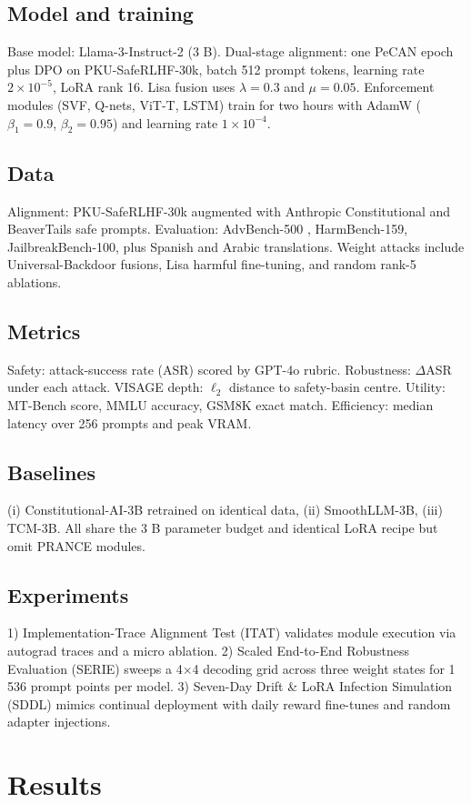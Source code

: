 \documentclass{article}
\begin{document}
\subsection{Model and training}
Base model: Llama-3-Instruct-2 (3 B). Dual-stage alignment: one PeCAN epoch plus DPO on PKU-SafeRLHF-30k, batch 512 prompt tokens, learning rate $2\times 10^{-5}$, LoRA rank 16. Lisa fusion uses $\lambda = 0.3$ and $\mu = 0.05$. Enforcement modules (SVF, Q-nets, ViT-T, LSTM) train for two hours with AdamW ($\beta_{1} = 0.9$, $\beta_{2} = 0.95$) and learning rate $1\times 10^{-4}$.
\subsection{Data}
Alignment: PKU-SafeRLHF-30k augmented with Anthropic Constitutional and BeaverTails safe prompts. Evaluation: AdvBench-500 \cite{chao-2024-jailbreakbench}, HarmBench-159, JailbreakBench-100, plus Spanish and Arabic translations. Weight attacks include Universal-Backdoor fusions, Lisa harmful fine-tuning, and random rank-5 ablations.
\subsection{Metrics}
Safety: attack-success rate (ASR) scored by GPT-4o rubric. Robustness: $\Delta$ASR under each attack. VISAGE depth: $\ell_{2}$ distance to safety-basin centre. Utility: MT-Bench score, MMLU accuracy, GSM8K exact match. Efficiency: median latency over 256 prompts and peak VRAM.
\subsection{Baselines}
(i) Constitutional-AI-3B retrained on identical data, (ii) SmoothLLM-3B, (iii) TCM-3B. All share the 3 B parameter budget and identical LoRA recipe but omit PRANCE modules.
\subsection{Experiments}
1) Implementation-Trace Alignment Test (ITAT) validates module execution via autograd traces and a micro ablation. 2) Scaled End-to-End Robustness Evaluation (SERIE) sweeps a 4$\times$4 decoding grid across three weight states for 1\,536 prompt points per model. 3) Seven-Day Drift \& LoRA Infection Simulation (SDDL) mimics continual deployment with daily reward fine-tunes and random adapter injections.

\section{Results}
\end{document}
